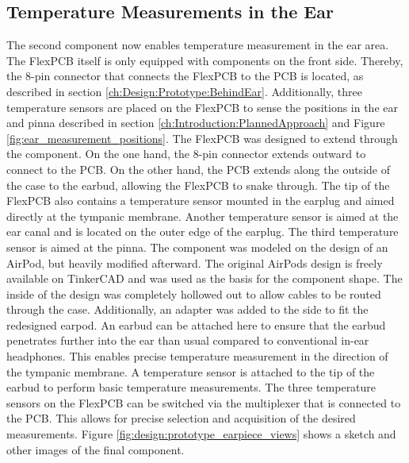 
\subsection{Temperature Measurements in the Ear}
\label{ch:Design:Prototype:Earpiece}

The second component now enables temperature measurement in the ear area. The FlexPCB itself is only equipped with components on the front side. Thereby, the 8-pin connector that connects the FlexPCB to the PCB is located, as described in section \ref{ch:Design:Prototype:BehindEar}.
Additionally, three temperature sensors are placed on the FlexPCB to sense the positions in the ear and pinna described in section \ref{ch:Introduction:PlannedApproach} and Figure \ref{fig:ear_measurement_positions}.
The FlexPCB was designed to extend through the component. 
On the one hand, the 8-pin connector extends outward to connect to the PCB. 
On the other hand, the PCB extends along the outside of the case to the earbud, allowing the FlexPCB to snake through. 
The tip of the FlexPCB also contains a temperature sensor mounted in the earplug and aimed directly at the tympanic membrane. 
Another temperature sensor is aimed at the ear canal and is located on the outer edge of the earplug. The third temperature sensor is aimed at the pinna.
The component was modeled on the design of an AirPod, but heavily modified afterward. 
The original AirPods design is freely available on TinkerCAD and was used as the basis for the component shape. 
The inside of the design was completely hollowed out to allow cables to be routed through the case. Additionally, an adapter was added to the side to fit the redesigned earpod. 
An earbud can be attached here to ensure that the earbud penetrates further into the ear than usual compared to conventional in-ear headphones. 
This enables precise temperature measurement in the direction of the tympanic membrane. A temperature sensor is attached to the tip of the earbud to perform basic temperature measurements.
The three temperature sensors on the FlexPCB can be switched via the multiplexer that is connected to the PCB. 
This allows for precise selection and acquisition of the desired measurements. Figure \ref{fig:design:prototype_earpiece_views} shows a sketch and other images of the final component.

